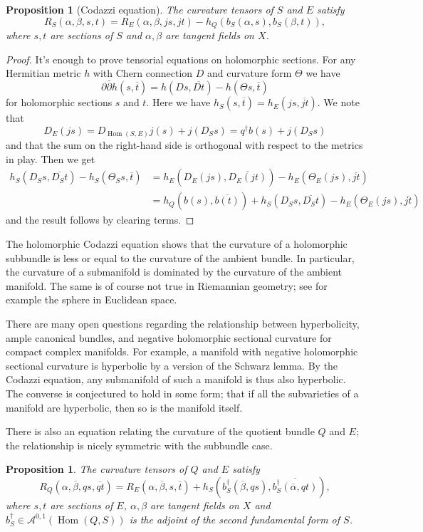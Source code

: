 \documentclass[10pt,a4paper]{article}
\newtheorem{prop}[theo]{Proposition}
\newtheorem*{proof}{Proof}
\newcommand{\cc}[1]{\mathcal{#1}}
\def\ov#1{\overline{#1}}
\DeclareMathOperator{\Hom}{Hom}
\begin{document}
\begin{prop}[Codazzi equation]
\label{prop:codazzi-equation}
The curvature tensors of $S$ and $E$ satisfy
\[
R_S(\alpha,\beta,s,t)
= R_{E}(\alpha,\beta,js,jt)
- h_Q(b_S(\alpha,s), b_S(\beta,t)),
\]
where $s, t$ are sections of $S$ and $\alpha,\beta$ are tangent fields on $X$.
\end{prop}


\begin{proof}
It's enough to prove tensorial equations on holomorphic sections.
For any Hermitian metric $h$ with Chern connection $D$ and curvature form $\Theta$ we have
\[
\partial\bar\partial h(s, \ov t)
= h(Ds, \ov{Dt}) - h(\Theta s, \ov t)
\]
for holomorphic sections $s$ and $t$. Here we have $h_S(s,\ov t) = h_E(js, \ov{jt})$. We note that
\[
D_E(js)
= D_{\Hom(S,E)}j(s) + j(D_Ss)
= q^\dagger b(s) + j(D_Ss)
\]
and that the sum on the right-hand side is orthogonal with respect to the metrics in play. Then we get
\begin{align*}
h_S(D_Ss, \ov{D_St}) - h_S(\Theta_S s, \ov t)
&= h_E(D_E(js), \ov{D_E(jt)}) - h_E(\Theta_E(js), \ov{jt})
\\
&= h_Q(b(s), \ov{b(t)}) + h_S(D_Ss, \ov{D_St}) - h_E(\Theta_E(js), \ov{jt})
\end{align*}
and the result follows by clearing terms.
\end{proof}


The holomorphic Codazzi equation shows that the curvature of a holomorphic subbundle is less or equal to the curvature of the ambient bundle. In particular, the curvature of a submanifold is dominated by the curvature of the ambient manifold. The same is of course not true in Riemannian geometry; see for example the sphere in Euclidean space.

There are many open questions regarding the relationship between hyperbolicity, ample canonical bundles, and negative holomorphic sectional curvature for compact complex manifolds. For example, a manifold with negative holomorphic sectional curvature is hyperbolic by a version of the Schwarz lemma. By the Codazzi equation, any submanifold of such a manifold is thus also hyperbolic. The converse is conjectured to hold in some form; that if all the subvarieties of a manifold are hyperbolic, then so is the manifold itself.

There is also an equation relating the curvature of the quotient bundle $Q$ and $E$; the relationship is nicely symmetric with the subbundle case.

\begin{prop}
The curvature tensors of $Q$ and $E$ satisfy
\[
R_Q(\alpha,\ov\beta,q s, \ov{q t})
= R_{E}(\alpha,\ov\beta,s,\ov t)
+ h_S(b_S^\dagger(\ov\beta,q s),\ov{ b_S^\dagger(\ov\alpha,q t)}),
\]
where $s, t$ are sections of $E$, $\alpha,\beta$ are tangent fields on
$X$ and $b_S^\dagger \in \cc A^{0,1}(\Hom(Q,S))$ is the adjoint of the second
fundamental form of $S$.
\end{prop}
\end{document}
